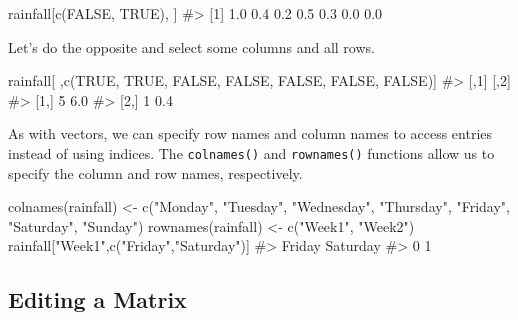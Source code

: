 \documentclass[
  letterpaper,
]{krantz}
\makeatletter
\newenvironment{Shaded}{\begin{snugshade}}{\end{snugshade}}
\newcommand{\CommentTok}[1]{\textcolor[rgb]{0.37,0.37,0.37}{#1}}
\newcommand{\ConstantTok}[1]{\textcolor[rgb]{0.56,0.35,0.01}{#1}}
\newcommand{\FunctionTok}[1]{\textcolor[rgb]{0.28,0.35,0.67}{#1}}
\newcommand{\NormalTok}[1]{\textcolor[rgb]{0.00,0.23,0.31}{#1}}
\newcommand{\OtherTok}[1]{\textcolor[rgb]{0.00,0.23,0.31}{#1}}
\newcommand{\StringTok}[1]{\textcolor[rgb]{0.13,0.47,0.30}{#1}}
\newenvironment{kframe}{%
\medskip{}
\setlength{\fboxsep}{.8em}
 \def\at@end@of@kframe{}%
 \ifinner\ifhmode%
  \def\at@end@of@kframe{\end{minipage}}%
  \begin{minipage}{\columnwidth}%
 \fi\fi%
 \def\FrameCommand##1{\hskip\@totalleftmargin \hskip-\fboxsep
 \colorbox{shadecolor}{##1}\hskip-\fboxsep
     \hskip-\linewidth \hskip-\@totalleftmargin \hskip\columnwidth}%
 \MakeFramed {\advance\hsize-\width
   \@totalleftmargin\z@ \linewidth\hsize
   \@setminipage}}%
 {\par\unskip\endMakeFramed%
 \at@end@of@kframe}
\renewenvironment{Shaded}{\begin{kframe}}{\end{kframe}}
\makeatother
\begin{document}
\begin{Shaded}
\begin{Highlighting}[]
\NormalTok{rainfall[}\FunctionTok{c}\NormalTok{(}\ConstantTok{FALSE}\NormalTok{, }\ConstantTok{TRUE}\NormalTok{), ]}
\CommentTok{\#\textgreater{} [1] 1.0 0.4 0.2 0.5 0.3 0.0 0.0}
\end{Highlighting}
\end{Shaded}

Let's do the opposite and select some columns and all rows.

\begin{Shaded}
\begin{Highlighting}[]
\NormalTok{rainfall[ ,}\FunctionTok{c}\NormalTok{(}\ConstantTok{TRUE}\NormalTok{, }\ConstantTok{TRUE}\NormalTok{, }\ConstantTok{FALSE}\NormalTok{, }\ConstantTok{FALSE}\NormalTok{, }\ConstantTok{FALSE}\NormalTok{, }\ConstantTok{FALSE}\NormalTok{, }\ConstantTok{FALSE}\NormalTok{)]}
\CommentTok{\#\textgreater{}      [,1] [,2]}
\CommentTok{\#\textgreater{} [1,]    5  6.0}
\CommentTok{\#\textgreater{} [2,]    1  0.4}
\end{Highlighting}
\end{Shaded}

As with vectors, we can specify row names and column names to access
entries instead of using indices. The \texttt{colnames()} and
\texttt{rownames()} functions allow us to specify the column and row
names, respectively.

\begin{Shaded}
\begin{Highlighting}[]
\FunctionTok{colnames}\NormalTok{(rainfall) }\OtherTok{\textless{}{-}} \FunctionTok{c}\NormalTok{(}\StringTok{"Monday"}\NormalTok{, }\StringTok{"Tuesday"}\NormalTok{, }\StringTok{"Wednesday"}\NormalTok{, }\StringTok{"Thursday"}\NormalTok{, }
                        \StringTok{"Friday"}\NormalTok{, }\StringTok{"Saturday"}\NormalTok{, }\StringTok{"Sunday"}\NormalTok{)}
\FunctionTok{rownames}\NormalTok{(rainfall) }\OtherTok{\textless{}{-}} \FunctionTok{c}\NormalTok{(}\StringTok{"Week1"}\NormalTok{, }\StringTok{"Week2"}\NormalTok{)}
\NormalTok{rainfall[}\StringTok{"Week1"}\NormalTok{,}\FunctionTok{c}\NormalTok{(}\StringTok{"Friday"}\NormalTok{,}\StringTok{"Saturday"}\NormalTok{)]}
\CommentTok{\#\textgreater{}   Friday Saturday }
\CommentTok{\#\textgreater{}        0        1}
\end{Highlighting}
\end{Shaded}

\hypertarget{editing-a-matrix}{%
\subsection{Editing a Matrix}\label{editing-a-matrix}}
\end{document}
